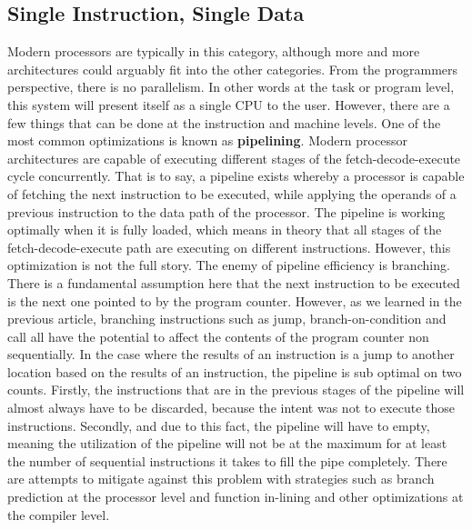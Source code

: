 \documentclass[10pt,a4paper]{article}
\begin{document}
\subsection{Single Instruction, Single Data}
Modern processors are typically in this category, although more and more architectures could arguably fit into the other categories. From the programmers perspective, there is no parallelism. In other words at the task or program level, this system will present itself as a single CPU to the user. However, there are a few things that can be done at the instruction and machine levels. One of the most common optimizations is known as {\bf pipelining}. Modern processor architectures are capable of executing different stages of the fetch-decode-execute cycle concurrently. That is to say, a pipeline exists whereby a processor is capable of fetching the next instruction to be executed, while applying the operands of a previous instruction to the data path of the processor. The pipeline is working optimally when it is fully loaded, which means in theory that all stages of the fetch-decode-execute path are executing on different instructions. However, this optimization is not the full story. The enemy of pipeline efficiency is branching. There is a fundamental assumption here that the next instruction to be executed is the next one pointed to by the program counter. However, as we learned in the previous article, branching instructions such as jump, branch-on-condition and call all have the potential to affect the contents of the program counter non sequentially. In the case where the results of an instruction is a jump to another location based on the results of an instruction, the pipeline is sub optimal on two counts. Firstly, the instructions that are in the previous stages of the pipeline will almost always have to be discarded, because the intent was not to execute those instructions. Secondly, and due to this fact, the pipeline will have to empty, meaning the utilization of the pipeline will not be at the maximum for at least the number of sequential instructions it takes to fill the pipe completely. There are attempts to mitigate against this problem with strategies such as branch prediction \cite{BRANCHPR} at the processor level and function in-lining \cite{INLINECOMPILER} and other optimizations at the compiler level.
\newline\newline
\end{document}
